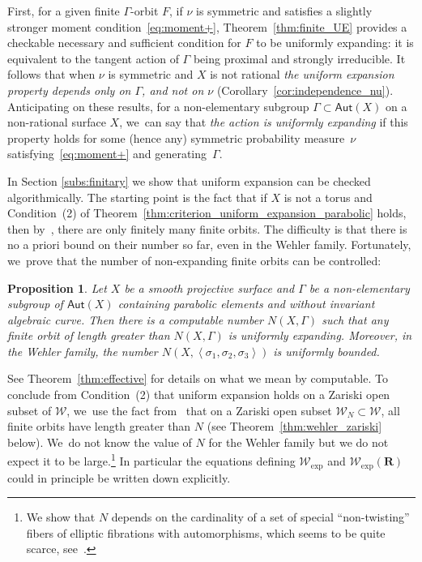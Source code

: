 \documentclass[JEP,XML,SOM,Unicode,published]{cedram}
\newcommand{\bra}[1]{\left\langle #1\right\rangle}
\def\R{\mathbf{R}}
\newcommand{\cW}{\mathcal{W}}
\newcommand\Aut{\mathsf{Aut}}
\theoremstyle{plain}
\newtheorem{pro}[thm]{Proposition}
\theoremstyle{definition}
\begin{document}
First, for a given finite $\Gamma$-orbit $F$,
if $\nu$ is symmetric and satisfies a slightly stronger moment condition~\eqref{eq:moment+}, Theorem~\ref{thm:finite_UE} provides a
checkable necessary and sufficient condition for $F$ to be uniformly expanding:
it is equivalent to the tangent action of $\Gamma$ being proximal and strongly irreducible. It
follows that when $\nu$ is symmetric and $X$ is not rational
{\emph{the uniform expansion property
depends only on $\Gamma$, and not on $\nu$}} (Corollary~\ref{cor:independence_nu}).
Anticipating on these results, for a non-elementary subgroup $\Gamma\subset\Aut(X)$ on a non-rational surface
$X$, we~can say that \emph{the action is uniformly expanding} if this property holds for some (hence any)
symmetric probability measure~$\nu$ satisfying~\eqref{eq:moment+} and
generating~$\Gamma$.

In Section \ref{subs:finitary} we show that uniform expansion can be checked algorithmically.
The starting point is the fact that if $X$ is not a torus and Condition~(2) of
Theorem~\ref{thm:criterion_uniform_expansion_parabolic} holds,
then by~\cite[Th.\,C]{finite_orbits}, there are only finitely many finite orbits.
The difficulty is that there is no a priori bound on their number so far, even in the Wehler family.
Fortunately, we~prove that the number of non-expanding finite orbits can be controlled:

\begin{pro}
Let $X$ be a smooth projective surface and $\Gamma $
be a non-elementary subgroup of $\Aut(X)$
containing parabolic elements and without invariant algebraic curve. Then there is a computable number $N(X, \Gamma)$ such that any finite orbit of length greater than $N(X, \Gamma)$ is uniformly expanding.
Moreover, in the Wehler family, the number $N(X, \bra{\sigma_1, \sigma_2, \sigma_3})$ is uniformly bounded.
\end{pro}

See Theorem~\ref{thm:effective} for details on what we mean by computable. To conclude
from Condition~(2) that uniform
expansion holds on a Zariski open subset of $\mathcal W$, we~use the fact from~\cite{finite_orbits}
that on a Zariski open subset $\mathcal W_N\subset \mathcal W$, all finite orbits have length
greater than $N$ (see Theorem~\ref{thm:wehler_zariski} below). We~do not know the value of $N$ for the Wehler family but we do not expect it to be large.\footnote{We show that $N$ depends on the cardinality of a set of special ``non-twisting'' fibers of elliptic fibrations with automorphisms, which seems to be quite scarce, see~\cite[Rem.\,7.7.14]{duistermaat}.}
In particular the equations defining $ \cW_{\mathrm{exp}}$ and $ \cW_{\mathrm{exp}}(\R)$
could in principle be written down explicitly.
\end{document}
